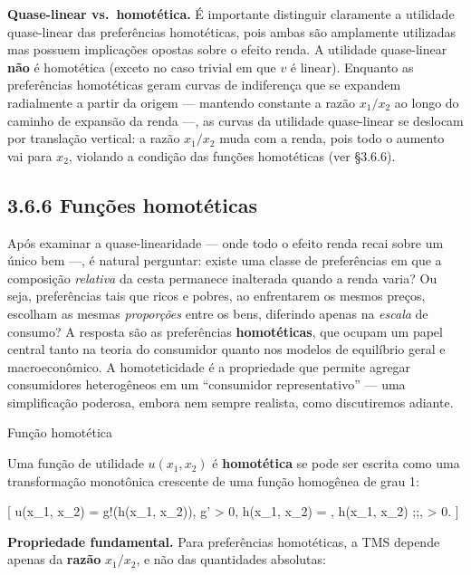 \documentclass[11pt,twoside,openright]{book}
\begin{document}
\textbf{Quase-linear vs.~homotética.} É importante distinguir claramente
a utilidade quase-linear das preferências homotéticas, pois ambas são
amplamente utilizadas mas possuem implicações opostas sobre o efeito
renda. A utilidade quase-linear \textbf{não} é homotética (exceto no
caso trivial em que \(v\) é linear). Enquanto as preferências
homotéticas geram curvas de indiferença que se expandem radialmente a
partir da origem --- mantendo constante a razão \(x_1/x_2\) ao longo do
caminho de expansão da renda ---, as curvas da utilidade quase-linear se
deslocam por translação vertical: a razão \(x_1/x_2\) muda com a renda,
pois todo o aumento vai para \(x_2\), violando a condição das funções
homotéticas (ver §3.6.6).

\subsection{3.6.6 Funções
homotéticas}\label{funuxe7uxf5es-homotuxe9ticas}

Após examinar a quase-linearidade --- onde todo o efeito renda recai
sobre um único bem ---, é natural perguntar: existe uma classe de
preferências em que a composição \emph{relativa} da cesta permanece
inalterada quando a renda varia? Ou seja, preferências tais que ricos e
pobres, ao enfrentarem os mesmos preços, escolham as mesmas
\emph{proporções} entre os bens, diferindo apenas na \emph{escala} de
consumo? A resposta são as preferências \textbf{homotéticas}, que ocupam
um papel central tanto na teoria do consumidor quanto nos modelos de
equilíbrio geral e macroeconômico. A homoteticidade é a propriedade que
permite agregar consumidores heterogêneos em um ``consumidor
representativo'' --- uma simplificação poderosa, embora nem sempre
realista, como discutiremos adiante.

\begin{definitionbox}{Função homotética}

Uma função de utilidade \(u(x_1, x_2)\) é \textbf{homotética} se pode
ser escrita como uma transformação monotônica crescente de uma função
homogênea de grau 1:

{[} u(x\_1, x\_2) = g!\big(h(x\_1, x\_2)\big), \quad g' \textgreater{}
0, \quad h(\lambda x\_1, \lambda x\_2) = \lambda , h(x\_1, x\_2)
;;\forall, \lambda \textgreater{} 0. {]}

\end{definitionbox}

\textbf{Propriedade fundamental.} Para preferências homotéticas, a TMS
depende apenas da \textbf{razão} \(x_1/x_2\), e não das quantidades
absolutas:
\end{document}
